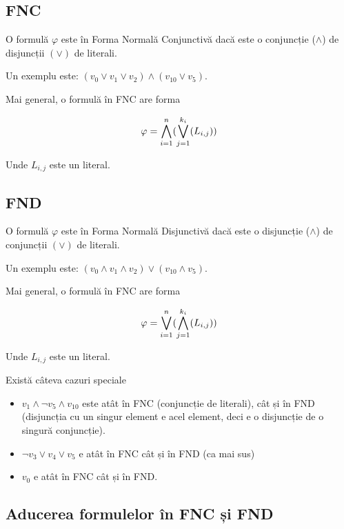 \subsection{FNC}

O formulă \( \varphi \) este în Forma Normală Conjunctivă dacă este o conjuncție (\( \land \)) de disjuncții \( (\lor) \) de literali.

Un exemplu este: \( (v_0 \lor v_1 \lor v_2) \land (v_{10} \lor v_5)  \).

Mai general, o formulă în FNC are forma

\[
	\varphi = \bigwedge\limits_{i = 1}^{n}(\bigvee\limits_{j=1}^{k_i}(L_{i,j}))
\]

Unde \( L_{i,j} \) este un literal.

\subsection{FND}

O formulă \( \varphi \) este în Forma Normală Disjunctivă dacă este o disjuncție (\( \land \)) de conjuncții \( (\lor) \) de literali.

Un exemplu este: \( (v_0 \land v_1 \land v_2) \lor (v_{10} \land v_5)  \).

Mai general, o formulă în FNC are forma

\[
	\varphi = \bigvee\limits_{i = 1}^{n}(\bigwedge\limits_{j=1}^{k_i}(L_{i,j}))
\]

Unde \( L_{i,j} \) este un literal.

\begin{note}
	Există câteva cazuri speciale
	\begin{itemize}
		\item \( v_1 \land \neg v_5 \land v_{10} \) este atât în FNC (conjuncție de literali), cât și în FND (disjuncția cu un singur element e acel element, deci
		      e o disjuncție de o singură conjuncție).

		\item \( \neg v_3 \lor v_4 \lor v_5 \) e atât în FNC cât și în FND (ca mai sus)

		\item \( v_0 \) e atât în FNC cât și în FND.
	\end{itemize}
\end{note}

\subsection{Aducerea formulelor în FNC și FND}

